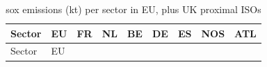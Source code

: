 \documentclass[
]{article}
\begin{document}
\begin{longtable}[]{@{}
  >{\centering\arraybackslash}p{}
  >{\centering\arraybackslash}p{}
  >{\centering\arraybackslash}p{}
  >{\centering\arraybackslash}p{}
  >{\centering\arraybackslash}p{}
  >{\centering\arraybackslash}p{}
  >{\centering\arraybackslash}p{}
  >{\centering\arraybackslash}p{}
  >{\centering\arraybackslash}p{}@{}}
\caption{sox emissions (kt) per sector in EU, plus UK proximal
ISOs}\tabularnewline
\toprule\noalign{}
\begin{minipage}[b]{\linewidth}\centering
Sector
\end{minipage} & \begin{minipage}[b]{\linewidth}\centering
EU
\end{minipage} & \begin{minipage}[b]{\linewidth}\centering
FR
\end{minipage} & \begin{minipage}[b]{\linewidth}\centering
NL
\end{minipage} & \begin{minipage}[b]{\linewidth}\centering
BE
\end{minipage} & \begin{minipage}[b]{\linewidth}\centering
DE
\end{minipage} & \begin{minipage}[b]{\linewidth}\centering
ES
\end{minipage} & \begin{minipage}[b]{\linewidth}\centering
NOS
\end{minipage} & \begin{minipage}[b]{\linewidth}\centering
ATL
\end{minipage} \\
\midrule\noalign{}
\endfirsthead
\toprule\noalign{}
\begin{minipage}[b]{\linewidth}\centering
Sector
\end{minipage} & \begin{minipage}[b]{\linewidth}\centering
EU
\end{minipage} & \begin{minipage}[b]{\linewidth}\centering

\end{minipage}
\end{longtable}
\end{document}
